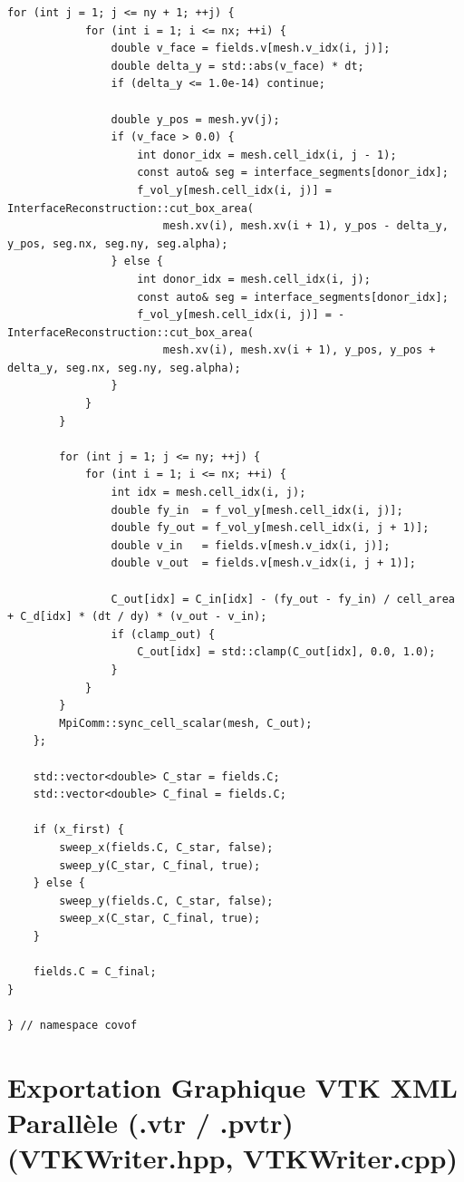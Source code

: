 \documentclass[10pt,a4paper,oneside]{book}
\begin{document}
\begin{lstlisting}[language={[11]C++}]
        for (int j = 1; j <= ny + 1; ++j) {
            for (int i = 1; i <= nx; ++i) {
                double v_face = fields.v[mesh.v_idx(i, j)];
                double delta_y = std::abs(v_face) * dt;
                if (delta_y <= 1.0e-14) continue;

                double y_pos = mesh.yv(j);
                if (v_face > 0.0) {
                    int donor_idx = mesh.cell_idx(i, j - 1);
                    const auto& seg = interface_segments[donor_idx];
                    f_vol_y[mesh.cell_idx(i, j)] = InterfaceReconstruction::cut_box_area(
                        mesh.xv(i), mesh.xv(i + 1), y_pos - delta_y, y_pos, seg.nx, seg.ny, seg.alpha);
                } else {
                    int donor_idx = mesh.cell_idx(i, j);
                    const auto& seg = interface_segments[donor_idx];
                    f_vol_y[mesh.cell_idx(i, j)] = -InterfaceReconstruction::cut_box_area(
                        mesh.xv(i), mesh.xv(i + 1), y_pos, y_pos + delta_y, seg.nx, seg.ny, seg.alpha);
                }
            }
        }

        for (int j = 1; j <= ny; ++j) {
            for (int i = 1; i <= nx; ++i) {
                int idx = mesh.cell_idx(i, j);
                double fy_in  = f_vol_y[mesh.cell_idx(i, j)];
                double fy_out = f_vol_y[mesh.cell_idx(i, j + 1)];
                double v_in   = fields.v[mesh.v_idx(i, j)];
                double v_out  = fields.v[mesh.v_idx(i, j + 1)];

                C_out[idx] = C_in[idx] - (fy_out - fy_in) / cell_area + C_d[idx] * (dt / dy) * (v_out - v_in);
                if (clamp_out) {
                    C_out[idx] = std::clamp(C_out[idx], 0.0, 1.0);
                }
            }
        }
        MpiComm::sync_cell_scalar(mesh, C_out);
    };

    std::vector<double> C_star = fields.C;
    std::vector<double> C_final = fields.C;

    if (x_first) {
        sweep_x(fields.C, C_star, false);
        sweep_y(C_star, C_final, true);
    } else {
        sweep_y(fields.C, C_star, false);
        sweep_x(C_star, C_final, true);
    }

    fields.C = C_final;
}

} // namespace covof

\end{lstlisting}

\chapter{Exportation Graphique VTK XML Parallèle (.vtr / .pvtr) (VTKWriter.hpp, VTKWriter.cpp)}
\end{document}
